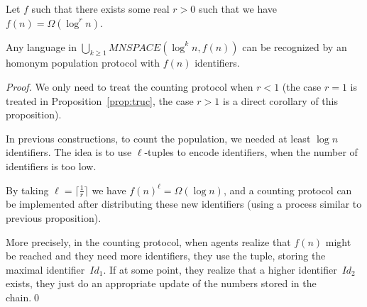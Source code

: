 \documentclass[UKenglish]{llncs}
\newcommand\id{identifier}
\begin{document}
\begin{proposition}
Let $f$ such that there exists some real $r>0$ such that we have $f(n)=\Omega(\log^r n)$.

Any language in $\bigcup_{k\ge1}MNSPACE(\log^k n,f(n))$ can be
recognized by an homonym population protocol with $f(n)$ identifiers.
\end{proposition}
\begin{proof} 
We only need to treat the counting protocol when $r<1$ (the case $r=1$ is treated in Proposition~\ref{prop:truc},
the case $r>1$ is a direct corollary of this proposition).

In previous constructions, to count the population, we needed at least
$\log n$ identifiers. The idea is to use $\ell$-tuples to encode
identifiers, when the number of identifiers is too low. 

By taking  $\ell=\lceil\frac 1r\rceil$ we have $f(n)^\ell=\Omega(\log n)$,
and a counting protocol can be implemented after distributing these
new identifiers (using a process similar to previous proposition). 

More precisely, in the counting protocol, when agents realize that $f(n)$ might be reached and they need more identifiers, they use the tuple,
storing the maximal \id\ $Id_1$. If at some point, they realize that a higher \id\ $Id_2$ exists,
they just do an appropriate update of the numbers stored in the chain.\hfill \qed

  \end{proof}
\end{document}
